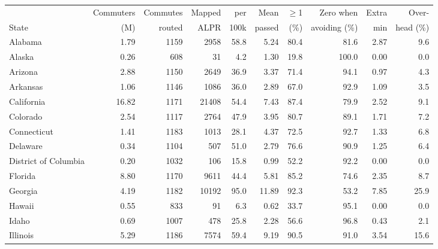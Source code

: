 \begin{tabular}{lrrrrrrrrr}
\toprule
& Commuters & Commutes & Mapped & per & Mean & $\geq$1 & Zero when & Extra & Over- \\
State & (M) & routed & ALPR & 100k & passed & (\%) & avoiding (\%) & min & head (\%) \\
\midrule
Alabama & \num{1.79} & \num{1159} & \num{2958} & \num{58.8} & \num{5.24} & \num{80.4} & \num{81.6} & \num{2.87} & \num{9.6} \\
Alaska & \num{0.26} & \num{608} & \num{31} & \num{4.2} & \num{1.30} & \num{19.8} & \num{100.0} & \num{0.00} & \num{0.0} \\
Arizona & \num{2.88} & \num{1150} & \num{2649} & \num{36.9} & \num{3.37} & \num{71.4} & \num{94.1} & \num{0.97} & \num{4.3} \\
Arkansas & \num{1.06} & \num{1146} & \num{1086} & \num{36.0} & \num{2.89} & \num{67.0} & \num{92.9} & \num{1.09} & \num{3.5} \\
California & \num{16.82} & \num{1171} & \num{21408} & \num{54.4} & \num{7.43} & \num{87.4} & \num{79.9} & \num{2.52} & \num{9.1} \\
Colorado & \num{2.54} & \num{1117} & \num{2764} & \num{47.9} & \num{3.95} & \num{80.7} & \num{89.1} & \num{1.71} & \num{7.2} \\
Connecticut & \num{1.41} & \num{1183} & \num{1013} & \num{28.1} & \num{4.37} & \num{72.5} & \num{92.7} & \num{1.33} & \num{6.8} \\
Delaware & \num{0.34} & \num{1104} & \num{507} & \num{51.0} & \num{2.79} & \num{76.6} & \num{90.9} & \num{1.25} & \num{6.4} \\
District of Columbia & \num{0.20} & \num{1032} & \num{106} & \num{15.8} & \num{0.99} & \num{52.2} & \num{92.2} & \num{0.00} & \num{0.0} \\
Florida & \num{8.80} & \num{1170} & \num{9611} & \num{44.4} & \num{5.81} & \num{85.2} & \num{74.6} & \num{2.35} & \num{8.7} \\
Georgia & \num{4.19} & \num{1182} & \num{10192} & \num{95.0} & \num{11.89} & \num{92.3} & \num{53.2} & \num{7.85} & \num{25.9} \\
Hawaii & \num{0.55} & \num{833} & \num{91} & \num{6.3} & \num{0.62} & \num{33.7} & \num{95.1} & \num{0.00} & \num{0.0} \\
Idaho & \num{0.69} & \num{1007} & \num{478} & \num{25.8} & \num{2.28} & \num{56.6} & \num{96.8} & \num{0.43} & \num{2.1} \\
Illinois & \num{5.29} & \num{1186} & \num{7574} & \num{59.4} & \num{9.19} & \num{90.5} & \num{91.0} & \num{3.54} & \num{15.6} \\

\end{tabular}
